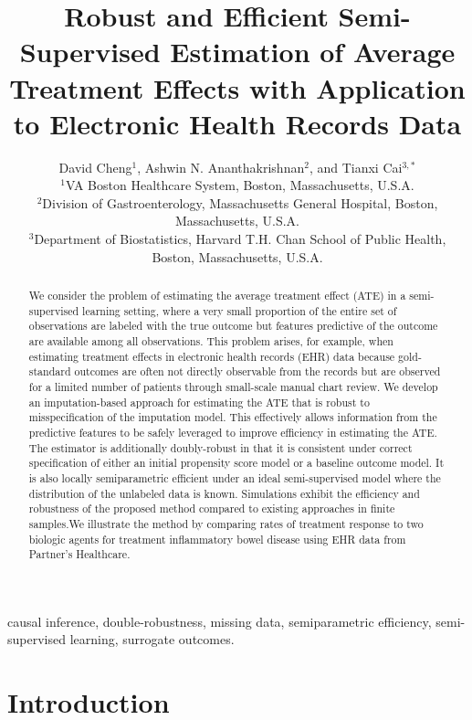 \documentclass[useAMS,referee,usenatbib]{biom}
\title[Semi-Supervised Estimation of Average Treatment Effects]{Robust and Efficient Semi-Supervised Estimation of Average Treatment Effects with Application to Electronic Health Records Data}
\author{David Cheng$^{1}$, 
Ashwin N. Ananthakrishnan$^{2}$, and Tianxi Cai$^{3,*}$\email{tcai@hsph.harvard.edu} \\
$^{1}$VA Boston Healthcare System, Boston, Massachusetts, U.S.A.\\
$^{2}$Division of Gastroenterology, Massachusetts General Hospital, Boston, Massachusetts, U.S.A.\\
$^{3}$Department of Biostatistics, Harvard T.H. Chan School of Public Health, Boston, Massachusetts, U.S.A.}
\begin{document}
\date{}


\label{firstpage}


\begin{abstract}
We consider the problem of estimating the average treatment effect (ATE) in a semi-supervised learning setting, where a 
very small proportion of the entire set of observations are labeled with the true outcome but features predictive of the outcome are available
among all observations. This problem arises, for example, when estimating treatment effects in electronic health records 
(EHR) data because gold-standard outcomes are often not directly observable from the records but are observed for a limited
number of patients through small-scale manual chart review. We develop an imputation-based
approach for estimating the ATE that is robust to misspecification of the imputation model. This effectively allows information
from the predictive features to be safely leveraged to improve efficiency in estimating the ATE.  The estimator is additionally
doubly-robust in that it is consistent under correct specification of either an initial propensity score model or a
baseline outcome model.  It is also locally semiparametric efficient under an ideal semi-supervised model where the distribution
of the unlabeled data is known. Simulations exhibit the efficiency and robustness of the proposed method compared to existing 
approaches in finite samples.We illustrate the method by comparing rates of treatment response to two biologic agents for 
treatment inflammatory bowel disease using EHR data from Partner's Healthcare.
\end{abstract}


\begin{keywords}
causal inference, double-robustness, missing data, semiparametric efficiency, semi-supervised learning, surrogate outcomes.
\end{keywords}

\maketitle



\section{Introduction}
\label{s:intro}
\end{document}

